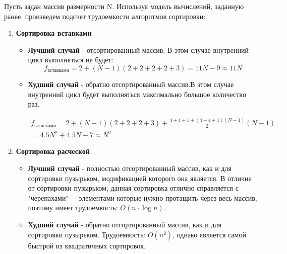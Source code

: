 \documentclass[a4paper,12pt]{report}
\begin{document}
\hspace{0.6cm}Пусть задан массив размерности N. Используя модель вычислений, заданную ранее, произведем подсчет трудоемкости алгоритмов сортировки:
\begin{enumerate}
\item \textbf{Сортировка вставками}
\begin{itemize}
\item \textbf{Лучший случай} - отсортированный массив. В этом случае внутренний цикл выполняться не будет:
\[
f_{вставками} = 2 + (N - 1)(2 + 2 + 2 + 2 + 3) = 11N - 9 \approx 11N 
\]
\item \textbf{Худший случай} - обратно отсортированный массив.В этом случае внутренний цикл будет выполняться максимально большое количество раз.

\begin{multline*}
f_{вставками} = 2 + (N - 1)(2 + 2 + 2 + 3) +  \frac{4 + 4 + 1 + (4+4+1)(N - 1)}{2}(N-1)=\\ =4.5N^2 + 4.5N - 7 \approx N^2
\end{multline*}
\end{itemize}

\item \textbf{Сортировка расческой} \cite{tutorials_point}.
\begin{itemize}
\item \textbf{Лучший случай} - полностью отсортированный массив, как и для сортировки пузырьком, модификацией которого она является. В отличие от сортировки пузырьком, данная сортировка отлично справляется с "черепахами" \ -  элементами которые нужно протащить через весь массив, поэтому имеет трудоемкость: $O(n\cdot \log n)$.

\item \textbf{Худший случай} - обратно отсортированный массив, как и для сортировки пузырьком. Трудоемкость: $O(n^{2})$, однако является самой быстрой из квадратичных сортировок.
\end{itemize}


\end{enumerate}
\end{document}
